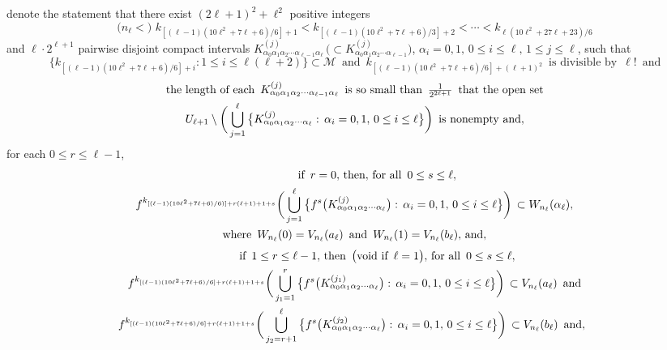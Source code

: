 \documentclass[12pt]{article}
\newcommand{\al}{\alpha}
\begin{document}
denote the statement that 
\noindent
there exist $(2\ell+1)^2+\ell^2$ positive integers 
$$
\big(n_{\ell} <\big) \,\, k_{[(\ell-1)(10\ell^2+7\ell+6)/6]+1} < k_{[(\ell-1)(10\ell^2+7\ell+6)/3]+2} < \cdots < k_{\ell(10\ell^2+27\ell+23)/6}
$$
and $\ell \cdot 2^{\ell+1}$ pairwise disjoint compact intervals $K_{\al_0\al_1\al_2\cdots \al_{\ell-1}\al_\ell}^{(j)} \, \big(\subset K_{\al_0\al_1\al_2\cdots \al_{\ell-1}}^{(j)}\big)$, $\al_i = 0, 1, \, 0 \le i \le \ell, \, 1 \le j \le \ell$, such that
$$
\{ k_{[(\ell-1)(10\ell^2+7\ell+6)/6]+i}: 1 \le i \le \ell(\ell+2) \} \subset \mathcal M \,\,\, \text{and} \,\,\, k_{[(\ell-1)(10\ell^2+7\ell+6)/6]+(\ell+1)^2} \,\,\, \text{is divisible by} \,\,\, {\ell}! \,\,\, \text{and}
$$ 
{\large 
\begin{multline*}
$$
\text{the length of each} \,\,\, K_{\al_0\al_1\al_2\cdots \al_{\ell-1}\al_\ell}^{(j)} \,\,\, \text{is so small than} \,\,\, \frac 1{2^{2\ell+1}} \,\,\, \text{that the open set} \\ 
U_{\ell+1} \setminus \bigg( \bigcup_{j=1}^\ell \big\{ K_{\al_0\al_1\al_2\cdots\al_{\ell}}^{(j)}: \, \al_i = 0, 1, \, 0 \le i \le \ell \big\} \bigg) \,\,\, \text{is nonempty and},
$$
\end{multline*}}
for each $0 \le r \le \ell-1$, 
\begin{multline*}
$$
\qquad\qquad \text{if} \,\,\, r = 0, \, \text{then}, \, \text{for all} \,\,\, 0 \le s \le \ell, \\
f^{k_{[(\ell-1)(10\ell^2+7\ell+6)/6)]+r(\ell+1)+1+s}}\bigg(\bigcup_{j=1}^\ell \big\{ f^s\big(K_{\al_0\al_1\al_2\cdots\al_\ell}^{(j)}\big): \, \al_i = 0, 1, \, 0 \le i \le \ell \big\}\bigg) \, \subset W_{n_\ell}(\al_\ell), \\ 
\text{where} \,\,\, W_{n_\ell}(0) = V_{n_\ell}(a_\ell) \,\,\, \text{and} \,\,\, W_{n_\ell}(1) = V_{n_\ell}(b_\ell), \, \text{and},
$$
\end{multline*}
\begin{multline*}
$$
\qquad\qquad \text{if} \,\,\, 1 \le r \le \ell-1, \, \text{then} \,\,\, \big(\text{void if} \,\,\, \ell = 1\big), \, \text{for all} \,\,\, 0 \le s \le \ell, \\
f^{k_{[(\ell-1)(10\ell^2+7\ell+6)/6]+r(\ell+1)+1+s}}\bigg(\bigcup_{j_1=1}^r \big\{ f^s\big(K_{\al_0\al_1\al_2\cdots\al_\ell}^{(j_1)}\big): \, \al_i = 0, 1, \, 0 \le i \le \ell \big\}\bigg) \, \subset V_{n_\ell}(a_\ell) \,\,\, \text{and} \\ 
f^{k_{[(\ell-1)(10\ell^2+7\ell+6)/6]+r(\ell+1)+1+s}}\bigg(\bigcup_{j_2=r+1}^\ell \big\{ f^s\big(K_{\al_0\al_1\al_2\cdots\al_\ell}^{(j_2)}\big): \, \al_i = 0, 1, \, 0 \le i \le \ell \big\}\bigg) \, \subset V_{n_\ell}(b_\ell) \,\,\,\text{and}, \,\,\,
$$
\end{multline*}
\end{document}
